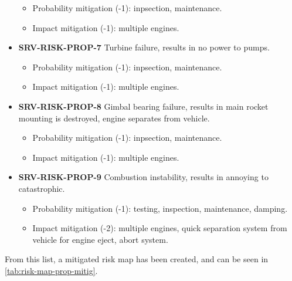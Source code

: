 \begin{itemize}
	\begin{itemize}
		 \item Probability mitigation (-1): inpsection, maintenance.		 \item Impact mitigation (-1): multiple engines.	\end{itemize}
	 \item \textbf{SRV-RISK-PROP-7} Turbine failure, results in no power to pumps.
	\begin{itemize}
		 \item Probability mitigation (-1): inpsection, maintenance.		 \item Impact mitigation (-1): multiple engines.	\end{itemize}
	 \item \textbf{SRV-RISK-PROP-8} Gimbal bearing failure, results in main rocket mounting is destroyed, engine separates from vehicle.
	\begin{itemize}
		 \item Probability mitigation (-1): inpsection, maintenance.		 \item Impact mitigation (-1): multiple engines.	\end{itemize}
	 \item \textbf{SRV-RISK-PROP-9} Combustion instability, results in annoying to catastrophic.
	\begin{itemize}
		 \item Probability mitigation (-1): testing, inspection, maintenance, damping.		 \item Impact mitigation (-2): multiple engines, quick separation system from vehicle for engine eject, abort system.	\end{itemize}
\end{itemize}

\noindent From this list, a mitigated risk map has been created, and can be seen in \autoref{tab:risk-map-prop-mitig}.

